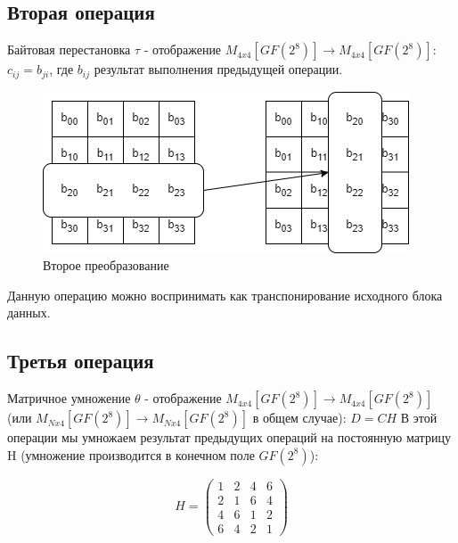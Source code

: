 \documentclass[12pt]{article}
\begin{document}
\subsection{Вторая операция}
Байтовая перестановка $\tau$ - отображение $M_{4x4}[GF(2^{8})] \to M_{4x4}[GF(2^{8})]$: \newline
$c_{ij} = b_{ji}$, где $b_{ij}$ результат выполнения предыдущей операции.

\begin{figure}[h]
    \centering
    \includegraphics[width=0.4\linewidth]{second_func.png}
    \caption{Второе преобразование}
    \label{fig:scheme}
\end{figure}

\newline
Данную операцию можно воспринимать как транспонирование исходного блока данных.

\subsection{Третья операция}
Матричное умножение $\theta$ - отображение $M_{4x4}[GF(2^{8})] \to M_{4x4}[GF(2^{8})]$ (или $M_{Nx4}[GF(2^{8})] \to M_{Nx4}[GF(2^{8})]$ в общем случае): \newline
$D = CH$
\newline
В этой операции мы умножаем результат предыдущих операций на постоянную матрицу H (умножение производится в конечном поле $GF(2^{8})$):

\[H = \left(
    \begin{array}{cccc}
    1 & 2 & 4 & 6\\
    2 & 1 & 6 & 4\\
    4 & 6 & 1 & 2\\
    6 & 4 & 2 & 1
    \end{array}
\right)\]
\end{document}
